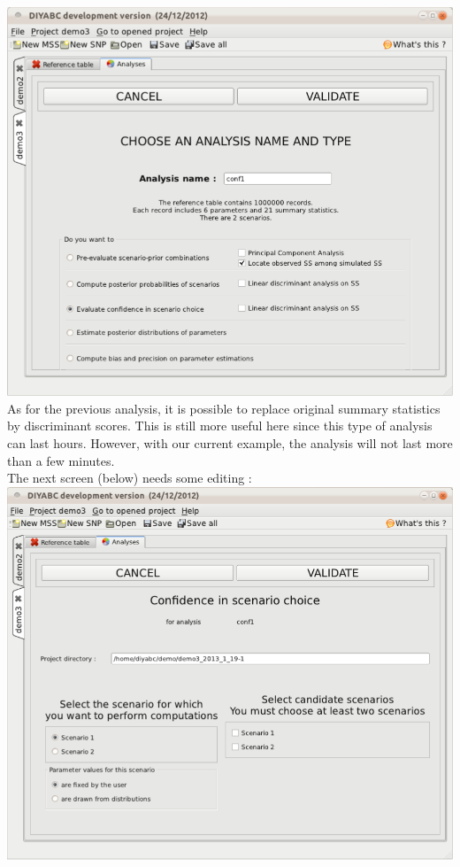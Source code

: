 \includegraphics[scale=0.33]{gui_pictures/Capture-DIYABC-115.png} \\

As for the previous analysis, it is possible to replace original summary statistics by discriminant scores. This is still more useful here since this type of analysis can last hours. However, with our current example, the analysis will not last more than a few minutes.\\
The next screen (below) needs some editing :\\

\includegraphics[scale=0.33]{gui_pictures/Capture-DIYABC-116.png} \\

